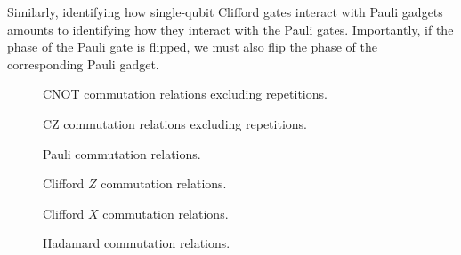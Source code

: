 
Similarly, identifying how single-qubit Clifford gates interact with Pauli gadgets amounts to identifying how they interact with the Pauli gates. Importantly, if the phase of the Pauli gate is flipped, we must also flip the phase of the corresponding Pauli gadget.


\begin{figure}[H]
    \centering
    \caption{CNOT commutation relations excluding repetitions.}
    \label{cnot-commutations}
\end{figure}

\begin{figure}[H]
    \centering
    \caption{CZ commutation relations excluding repetitions.}
    \label{cz-commutations}
\end{figure}

\begin{figure}[H]
    \centering
    \caption{Pauli commutation relations.}
    \label{pauli-commutations}
\end{figure}

\begin{figure}[H]
    \centering
    \caption{Clifford $Z$ commutation relations.}
    \label{clifford-z-commutations}
\end{figure}

\begin{figure}[H]
    \centering
    \caption{Clifford $X$ commutation relations.}
    \label{clifford-x-commutations}
\end{figure}

\begin{figure}[H]
    \centering
    \caption{Hadamard commutation relations.}
    \label{clifford-h-commutations}
\end{figure}


